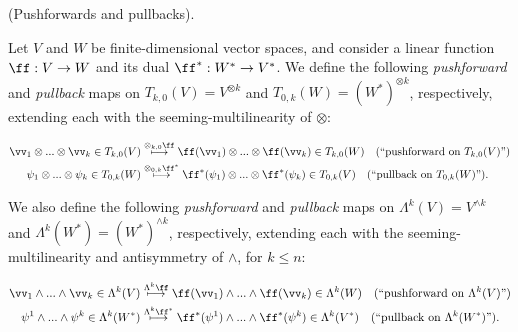 \begin{defn}
\label{ch::exterior_pwrs::defn::pushforward_on_Tk0}
    (Pushforwards and pullbacks).
    
    Let $V$ and $W$ be finite-dimensional vector spaces, and consider a linear function $\ff:V \rightarrow W$ and its dual $\ff^*:W^* \rightarrow V^*$. We define the following \textit{pushforward} and \textit{pullback} maps on $T_{k,0}(V) = V^{\otimes k}$ and $T_{0,k}(W) = (W^*)^{\otimes k}$, respectively, extending each with the seeming-multilinearity of $\otimes$:
    
    \begin{align*}
        \vv_1 \otimes ... \otimes \vv_k \in T_{k,0}(V) &\overset{\otimes_{k, 0} \ff}{\longmapsto} \ff(\vv_1) \otimes ... \otimes \ff(\vv_k) \in T_{k,0}(W) \quad \text{(``pushforward on $T_{k,0}(V)$'')} \\
        \psi_1 \otimes ... \otimes \psi_k \in T_{0,k}(W) &\overset{\otimes_{0, k} \ff^*}{\longmapsto} \ff^*(\psi_1) \otimes ... \otimes \ff^*(\psi_k) \in T_{0,k}(V) \quad \text{(``pullback on $T_{0,k}(W)$'')}.
    \end{align*}
    
    We also define the following \textit{pushforward} and \textit{pullback} maps on $\Lambda^k(V) = V^{\wedge k}$ and $\Lambda^k(W^*) = (W^*)^{\wedge k}$, respectively, extending each with the seeming-multilinearity and antisymmetry of $\wedge$, for $k \leq n$:
    
    \begin{align*}
        \vv_1 \wedge ... \wedge \vv_k \in \Lambda^k(V) &\overset{\Lambda^k \ff}{\longmapsto} \ff(\vv_1) \wedge ... \wedge \ff(\vv_k) \in \Lambda^k(W) \quad \text{(``pushforward on $\Lambda^k(V)$'')} \\
        \psi^1 \wedge ... \wedge \psi^k \in \Lambda^k(W^*) &\overset{\Lambda^k \ff^*}{\longmapsto} \ff^*(\psi^1) \wedge ... \wedge \ff^*(\psi^k) \in \Lambda^k(V^*) \quad \text{(``pullback on $\Lambda^k(W^*)$'')}.
    \end{align*}
\end{defn}

